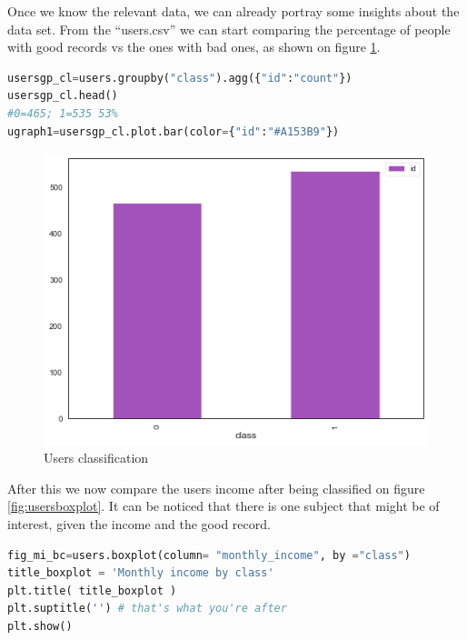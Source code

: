\documentclass[a4paper,12pt]{article}
\begin{document}
Once we know the relevant data, we can already portray some insights about the data set. From the ``users.csv'' we can start comparing the percentage of people with good records vs the ones with bad ones, as shown on figure \ref{fig:usersbplot}.\vspace{3mm}

\begin{lstlisting}[language=python,caption = {God and bad users}]
usersgp_cl=users.groupby("class").agg({"id":"count"})
usersgp_cl.head()
#0=465; 1=535 53%
ugraph1=usersgp_cl.plot.bar(color={"id":"#A153B9"})
\end{lstlisting}

\begin{figure}[h!]
    \centering
    \includegraphics[scale=0.8]{Images/users_class_barp.png}
    \caption{Users classification}
    \label{fig:usersbplot}
\end{figure}\newpage

After this we now compare the users income after being classified on figure \ref{fig:usersboxplot}. It can be noticed that there is one subject that might be of interest, given the income and the good record.\vspace{3mm}

\begin{lstlisting}[language=python,caption = {Income by class}]
fig_mi_bc=users.boxplot(column= "monthly_income", by ="class")
title_boxplot = 'Monthly income by class'
plt.title( title_boxplot )
plt.suptitle('') # that's what you're after
plt.show()
\end{lstlisting}
\end{document}
